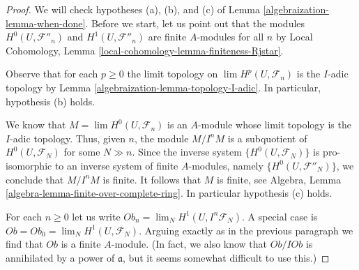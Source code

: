 \begin{proof}

We will check hypotheses (a), (b), and (c) of Lemma \ref{algebraization-lemma-when-done}.
Before we start, let us point out that the modules
$H^0(U, \mathcal{F}''_n)$ and $H^1(U, \mathcal{F}''_n)$
are finite $A$-modules for all $n$ by
Local Cohomology, Lemma \ref{local-cohomology-lemma-finiteness-Rjstar}.

\medskip\noindent
Observe that for each $p \geq 0$
the limit topology on $\lim H^p(U, \mathcal{F}_n)$
is the $I$-adic topology by Lemma \ref{algebraization-lemma-topology-I-adic}.
In particular, hypothesis (b) holds.

\medskip\noindent
We know that $M = \lim H^0(U, \mathcal{F}_n)$ is an $A$-module whose
limit topology is the $I$-adic topology. Thus, given $n$, the module
$M/I^nM$ is a subquotient of $H^0(U, \mathcal{F}_N)$ for some $N \gg n$.
Since the inverse system $\{H^0(U, \mathcal{F}_N)\}$ is pro-isomorphic to an
inverse system of finite $A$-modules, namely $\{H^0(U, \mathcal{F}''_N)\}$,
we conclude that $M/I^nM$ is finite. It follows that $M$ is finite, see
Algebra, Lemma \ref{algebra-lemma-finite-over-complete-ring}.
In particular hypothesis (c) holds.

\medskip\noindent
For each $n \geq 0$ let us write $Ob_n = \lim_N H^1(U, I^n\mathcal{F}_N)$.
A special case is $Ob = Ob_0 = \lim_N H^1(U, \mathcal{F}_N)$.
Arguing exactly as in the previous paragraph we find that $Ob$
is a finite $A$-module. (In fact, we also know that $Ob/I Ob$ is annihilated
by a power of $\mathfrak a$, but it seems somewhat difficult to use this.)


\end{proof}
